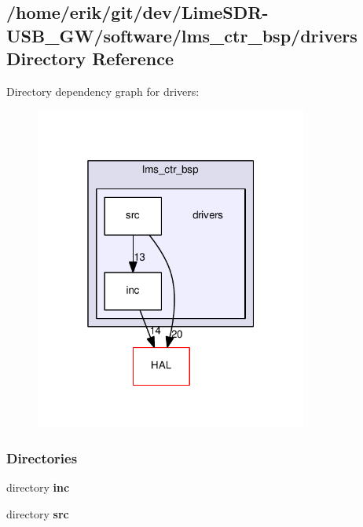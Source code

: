 \subsection{/home/erik/git/dev/\+Lime\+S\+D\+R-\/\+U\+S\+B\+\_\+\+G\+W/software/lms\+\_\+ctr\+\_\+bsp/drivers Directory Reference}
\label{dir_d691928d4e4bf3b160a630c406fe2492}
Directory dependency graph for drivers\+:
\nopagebreak
\begin{figure}[H]
\begin{center}
\leavevmode
\includegraphics[width=254pt]{dir_d691928d4e4bf3b160a630c406fe2492_dep}
\end{center}
\end{figure}
\subsubsection*{Directories}
\begin{DoxyCompactItemize}
\item 
directory {\bf inc}
\item 
directory {\bf src}
\end{DoxyCompactItemize}
